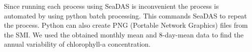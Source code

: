 Since running each process using SeaDAS is inconvenient the process is automated by using python batch processing. This commands SeaDAS to repeat the process. Python can also create PNG (Portable Network Graphics) files from the SMI. We used the obtained monthly mean and 8-day-mean data to find the annual variability of chlorophyll-a concentration.